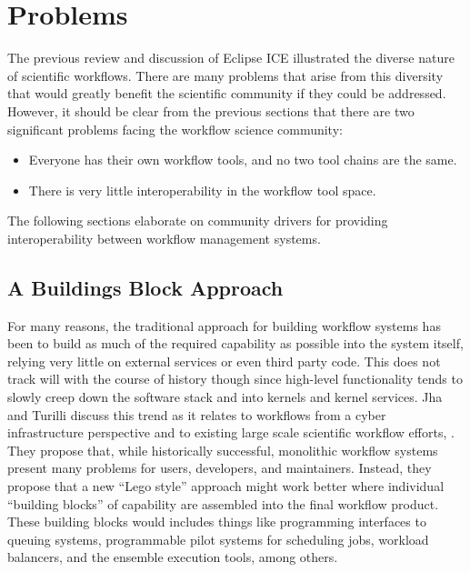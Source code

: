 \chapter{Problems}

The previous review and discussion of Eclipse ICE illustrated the
diverse nature of scientific workflows. There are many problems that
arise from this diversity that would greatly benefit the scientific
community if they could be addressed. However, it should be clear from
the previous sections that there are two significant problems facing the
workflow science community:
\begin{itemize}
  \item Everyone has their own workflow tools, and
no two tool chains are the same.
  \item There is very little interoperability in the workflow tool space.
\end{itemize}

The following sections elaborate on community drivers for providing
interoperability between workflow management systems.

\section{A Buildings Block Approach}\label{a-buildings-block-approach}

For many reasons, the traditional approach for building workflow systems
has been to build as much of the required capability as possible into
the system itself, relying very little on external services or even
third party code. This does not track will with the course of history
though since high-level functionality tends to slowly creep down the
software stack and into kernels and kernel services. Jha and Turilli
discuss this trend as it relates to workflows from a cyber
infrastructure perspective and to existing large scale scientific
workflow efforts, \cite{jha_building_2016}. They propose that, while historically
successful, monolithic workflow systems present many problems for users,
developers, and maintainers. Instead, they propose that a new ``Lego
style'' approach might work better where individual ``building blocks''
of capability are assembled into the final workflow product. These
building blocks would includes things like programming interfaces to
queuing systems, programmable pilot systems for scheduling jobs,
workload balancers, and the ensemble execution tools, among others.

